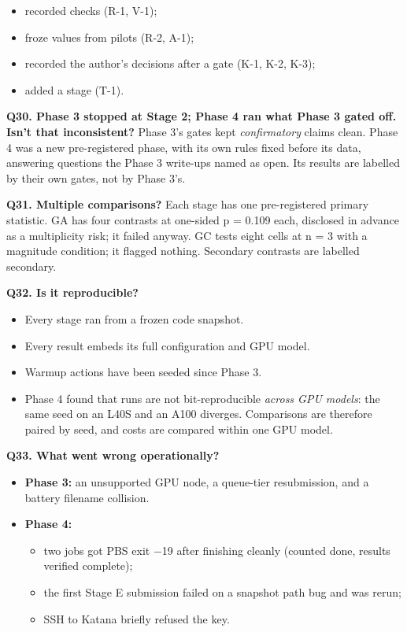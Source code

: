 \documentclass[11pt]{article}
\begin{document}
\begin{itemize}
\item recorded checks (R-1, V-1);
\item froze values from pilots (R-2, A-1);
\item recorded the author's decisions after a gate (K-1, K-2, K-3);
\item added a stage (T-1).
\end{itemize}



\textbf{Q30. Phase 3 stopped at Stage 2; Phase 4 ran what Phase 3 gated off. Isn't that inconsistent?} Phase 3's gates kept \emph{confirmatory} claims clean. Phase 4 was a new pre-registered phase, with its own rules fixed before its data, answering questions the Phase 3 write-ups named as open. Its results are labelled by their own gates, not by Phase 3's.



\textbf{Q31. Multiple comparisons?} Each stage has one pre-registered primary statistic. GA has four contrasts at one-sided p = 0.109 each, disclosed in advance as a multiplicity risk; it failed anyway. GC tests eight cells at n = 3 with a magnitude condition; it flagged nothing. Secondary contrasts are labelled secondary.



\textbf{Q32. Is it reproducible?}

\begin{itemize}
\item Every stage ran from a frozen code snapshot.
\item Every result embeds its full configuration and GPU model.
\item Warmup actions have been seeded since Phase 3.
\item Phase 4 found that runs are not bit-reproducible \emph{across GPU models}: the same seed on an L40S and an A100 diverges. Comparisons are therefore paired by seed, and costs are compared within one GPU model.
\end{itemize}



\textbf{Q33. What went wrong operationally?}

\begin{itemize}
\item \textbf{Phase 3:} an unsupported GPU node, a queue-tier resubmission, and a battery filename collision.
\item \textbf{Phase 4:}
\begin{itemize}
\item two jobs got PBS exit $-$19 after finishing cleanly (counted done, results verified complete);
\item the first Stage E submission failed on a snapshot path bug and was rerun;
\item SSH to Katana briefly refused the key.
\end{itemize}
\end{itemize}
\end{document}
